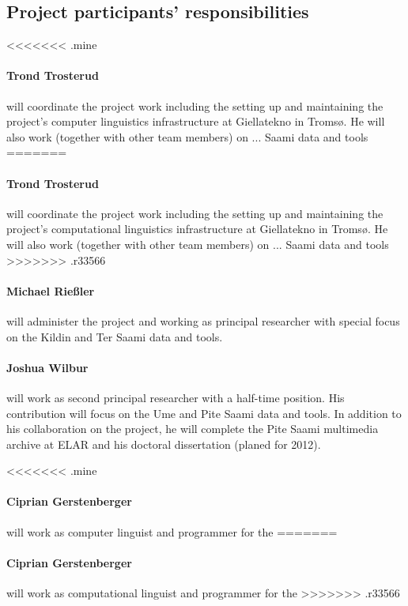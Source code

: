 \documentclass[a4paper,12pt]{article}
\begin{document}
{{{{\subsection{Project participants' responsibilities}

<<<<<<< .mine
\paragraph{Trond Trosterud} will coordinate the project work including the setting up and maintaining the project's computer linguistics infrastructure at Giellatekno in Tromsø. He will also work (together with other team members) on ... Saami data and tools
=======
\paragraph{Trond Trosterud} will coordinate the project work including the setting up and maintaining the project's computational linguistics infrastructure at Giellatekno in Tromsø. He will also work (together with other team members) on ... Saami data and tools%
>>>>>>> .r33566

\paragraph{Michael Rießler} will administer the project and working as principal researcher with special focus on the Kildin and Ter Saami data and tools.%

\paragraph{Joshua Wilbur} will work as second principal researcher with a half-time position. His contribution will focus on the Ume and Pite Saami data and tools. In addition to his collaboration on the project, he will complete the Pite Saami multimedia archive at ELAR and his doctoral dissertation (planed for 2012).

<<<<<<< .mine
\paragraph{Ciprian Gerstenberger} will work as computer linguist and programmer for the %
=======
\paragraph{Ciprian Gerstenberger} will work as computational linguist and programmer for the 
>>>>>>> .r33566

}}}}
\end{document}
